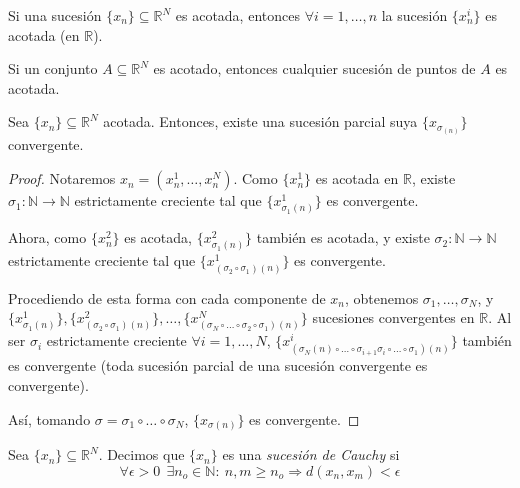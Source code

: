 \begin{nprop}
Si una sucesión $\{x_n\} \subseteq \mathbb{R}^N$ es acotada, entonces $\forall i=1,\dots,n$ la sucesión $\{x_n^i\}$ es acotada (en $\mathbb{R}$).
\end{nprop}



\begin{nota}
Si un conjunto $A\subseteq \mathbb{R}^N$ es acotado, entonces cualquier sucesión de puntos de $A$ es acotada.
\end{nota}



\begin{nth}
Sea $\{x_n\}\subseteq \mathbb{R}^N$ acotada. Entonces, existe una sucesión parcial suya $\{x_{\sigma_{(n)}}\}$ convergente.
\end{nth}

\begin{proof}
	Notaremos $x_n = (x_n^1, \dots, x_n^N)$. Como $\{x_n^1\}$ es acotada en $\mathbb{R}$, existe $\sigma_1 : \mathbb{N} \rightarrow \mathbb{N}$ estrictamente creciente tal que $\{x_{\sigma_1(n)}^1\}$ es convergente.

Ahora, como $\{x_n^2\}$ es acotada, $\{x_{\sigma_1(n)}^2\}$ también es acotada, y existe $\sigma_2 : \mathbb{N} \rightarrow \mathbb{N}$ estrictamente creciente tal que $\{x_{(\sigma_2\circ\sigma_1)(n)}^1\}$ es convergente.

Procediendo de esta forma con cada componente de $x_n$, obtenemos $\sigma_1, \dots, \sigma_N$, y\\ $\{x_{\sigma_1(n)}^1\}, \{x_{(\sigma_2\circ\sigma_1)(n)}^2\}, \dots, \{x_{(\sigma_N\circ\dots\circ\sigma_2\circ\sigma_1)(n)}^N\}$ sucesiones convergentes en $\mathbb{R}$. Al ser $\sigma_i$ estrictamente creciente $\forall i=1,\dots,N$, $\{x_{(\sigma_N(n)\circ\dots\circ\sigma_{i+1}\sigma_i\circ\dots\circ\sigma_1)(n)}^i\}$ también es convergente (toda sucesión parcial de una sucesión convergente es convergente).

Así, tomando $\sigma = \sigma_1\circ\dots\circ\sigma_N$, $\{x_{\sigma(n)}\}$ es convergente.
\end{proof}


\begin{ndef}
Sea $\{x_n\}\subseteq \mathbb{R}^N$. Decimos que $\{x_n\}$ es una \textit{sucesión de Cauchy} si $$ \forall \epsilon > 0\ \ \exists n_o \in \mathbb{N}: \ n,m\ge n_o \Rightarrow d(x_n,x_m) < \epsilon$$
\end{ndef}



